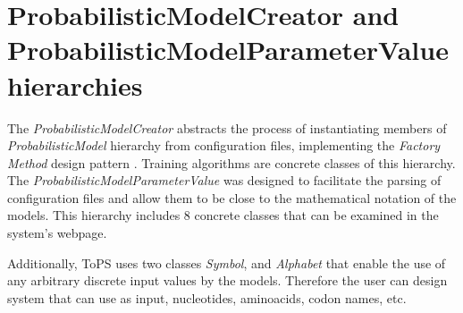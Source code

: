 \section{ProbabilisticModelCreator   and ProbabilisticModelParameterValue   hierarchies }

The \textit{ProbabilisticModelCreator}  abstracts the process of instantiating members of \textit{ProbabilisticModel} hierarchy from configuration files, implementing the {\it Factory Method}  design pattern \cite{Gamma1994}. Training algorithms are concrete classes of this hierarchy.
The \textit{ProbabilisticModelParameterValue} was designed to facilitate the parsing of configuration files and allow them to be close to the mathematical notation of the models. This hierarchy includes 8 concrete classes that can be examined in the system's webpage. 

Additionally,  ToPS uses two classes \textit{Symbol}, and  \textit{Alphabet} that enable the use of any arbitrary discrete input values by the models. Therefore the user can design system that can use as input, nucleotides, aminoacids, codon names, etc. 



